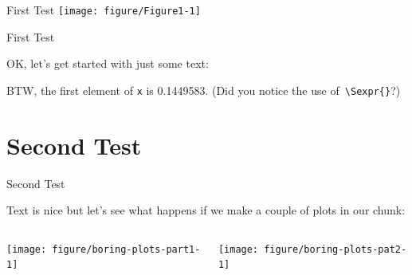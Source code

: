 \documentclass[xcolor=pdftex,dvipsnames,table]{beamer}\usepackage[]{graphicx}\usepackage[]{color}
\newenvironment{knitrout}{}{} %
\begin{document}
\begin{frame}[fragile]{First Test}  %
\begin{knitrout}
\color{fgcolor}
\texttt{[image: figure/Figure1-1]} 

\end{knitrout}
\end{frame}


\begin{frame}[fragile]{First Test}

OK, let's get started with just some text:



BTW, the first element of \texttt{x} is 0.1449583. (Did you notice
the use of\texttt{ \textbackslash{}Sexpr\{\}}?)
\end{frame}

\section{Second Test}
\begin{frame}[fragile]{Second Test}

Text is nice but let's see what happens if we make a couple of plots
in our chunk:

\begin{columns}
    \begin{column}{.5\linewidth}
\begin{knitrout}
\color{fgcolor}
\texttt{[image: figure/boring-plots-part1-1]} 

\end{knitrout}
    \end{column}
    \begin{column}{.5\linewidth}
\begin{knitrout}
\color{fgcolor}
\texttt{[image: figure/boring-plots-pat2-1]} 

\end{knitrout}
    \end{column}
  \end{columns}
\end{frame}
\end{document}
